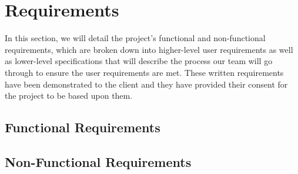 \chapter{Requirements} \label{ch:Requirements}

In this section, we will detail the project's functional and non-functional requirements, which are broken down into
higher-level user requirements as well as lower-level specifications that will describe the process our team will go
through to ensure the user requirements are met. These written requirements have been demonstrated to the client and they have provided their consent for the project to be based upon them.

\section{Functional Requirements} \label{sec:func_requirements}

\vspace{1em}  \vspace{5em}

\section{Non-Functional Requirements} \label{sec:non_func_requirements}

\vspace{1em}  \vspace{5em}
